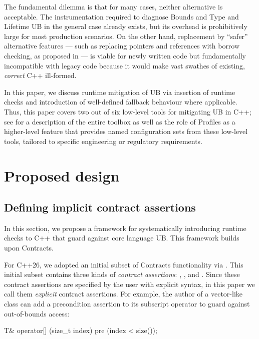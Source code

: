 The fundamental dilemma is that for many cases, neither alternative is acceptable. The instrumentation required to diagnose Bounds and Type and Lifetime UB in the general case already exists, but its overhead is prohibitively large for most production scenarios. On the other hand, replacement by ``safer'' alternative features --- such as replacing pointers and references with borrow checking, as proposed in \cite{P3390R0} --- is viable for newly written code but fundamentally incompatible with legacy code because it would make vast swathes of existing, \emph{correct} C++ ill-formed.

In this paper, we discuss runtime mitigation of UB via insertion of runtime checks and introduction of well-defined fallback behaviour where applicable. Thus, this paper covers two out of six low-level tools for mitigating UB in C++; see \cite{P3756R0} %
for a description of the entire toolbox as well as the role of Profiles as a higher-level feature that provides named configuration sets from these low-level tools, tailored to specific engineering or regulatory requirements.

\section{Proposed design}
\label{design}

\subsection{Defining implicit contract assertions}
\label{defineicas}

In this section, we propose a framework for systematically introducing runtime checks to C++ that guard against core language UB. This framework builds upon Contracts.

For C++26, we adopted an initial subset of Contracts functionality via \cite{P2900R14}. This initial subset contains three kinds of \emph{contract assertions}: , , and . Since these contract assertions are specified by the user with explicit syntax, in this paper we call them \emph{explicit} contract assertions. For example, the author of a vector-like class can add a precondition assertion to its subscript operator to guard against out-of-bounds access:

\begin{codeblock}
T& operator[] (size_t index)
  pre (index < size());
\end{codeblock}

